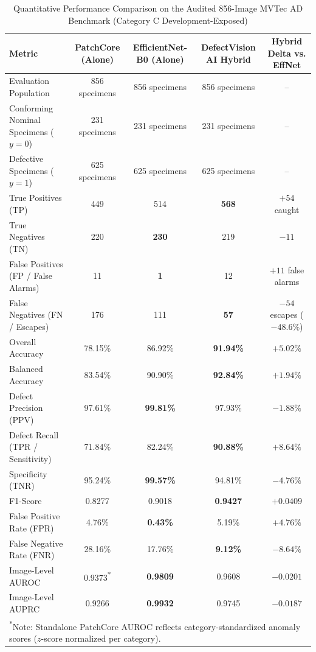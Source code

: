 \begin{table}[t]
\centering
\caption{Quantitative Performance Comparison on the Audited 856-Image MVTec AD Benchmark (Category C Development-Exposed)}
\label{tab:mvtec_comparison}
\begin{tabular}{lcccc}
\toprule
\textbf{Metric} & \textbf{PatchCore (Alone)} & \textbf{EfficientNet-B0 (Alone)} & \textbf{DefectVision AI Hybrid} & \textbf{Hybrid Delta vs. EffNet} \\
\midrule
Evaluation Population & 856 specimens & 856 specimens & 856 specimens & -- \\
Conforming Nominal Specimens ($y=0$) & 231 specimens & 231 specimens & 231 specimens & -- \\
Defective Specimens ($y=1$) & 625 specimens & 625 specimens & 625 specimens & -- \\
\midrule
True Positives (TP) & 449 & 514 & \textbf{568} & $+54$ caught \\
True Negatives (TN) & 220 & \textbf{230} & 219 & $-11$ \\
False Positives (FP / False Alarms) & 11 & \textbf{1} & 12 & $+11$ false alarms \\
False Negatives (FN / Escapes) & 176 & 111 & \textbf{57} & $-54$ escapes ($-48.6\%$) \\
\midrule
Overall Accuracy & 78.15\% & 86.92\% & \textbf{91.94\%} & $+5.02\%$ \\
Balanced Accuracy & 83.54\% & 90.90\% & \textbf{92.84\%} & $+1.94\%$ \\
Defect Precision (PPV) & 97.61\% & \textbf{99.81\%} & 97.93\% & $-1.88\%$ \\
Defect Recall (TPR / Sensitivity) & 71.84\% & 82.24\% & \textbf{90.88\%} & $+8.64\%$ \\
Specificity (TNR) & 95.24\% & \textbf{99.57\%} & 94.81\% & $-4.76\%$ \\
F1-Score & 0.8277 & 0.9018 & \textbf{0.9427} & $+0.0409$ \\
False Positive Rate (FPR) & 4.76\% & \textbf{0.43\%} & 5.19\% & $+4.76\%$ \\
False Negative Rate (FNR) & 28.16\% & 17.76\% & \textbf{9.12\%} & $-8.64\%$ \\
Image-Level AUROC & 0.9373\textsuperscript{*} & \textbf{0.9809} & 0.9608 & $-0.0201$ \\
Image-Level AUPRC & 0.9266 & \textbf{0.9932} & 0.9745 & $-0.0187$ \\
\bottomrule
\multicolumn{5}{l}{\footnotesize \textsuperscript{*}Note: Standalone PatchCore AUROC reflects category-standardized anomaly scores ($z$-score normalized per category).}
\end{tabular}
\end{table}
